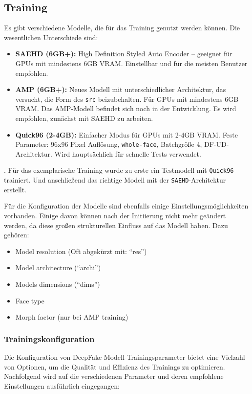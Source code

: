 \subsection*{Training}\label{subsec:training}
Es gibt verschiedene Modelle, die für das Training genutzt werden können.
Die wesentlichen Unterschiede sind:
\begin{itemize}
    \item \textbf{SAEHD (6GB+):} High Definition Styled Auto Encoder – geeignet für GPUs mit mindestens 6GB VRAM.
    Einstellbar und für die meisten Benutzer empfohlen.
    \item \textbf{AMP (6GB+):} Neues Modell mit unterschiedlicher Architektur, das versucht, die Form des \texttt{src} beizubehalten.
    Für GPUs mit mindestens 6GB VRAM.
Das AMP-Modell befindet sich noch in der Entwicklung.
    Es wird empfohlen, zunächst mit SAEHD zu arbeiten.
    \item \textbf{Quick96 (2-4GB):} Einfacher Modus für GPUs mit 2-4GB VRAM.
    Feste Parameter: 96x96 Pixel Auflösung, \texttt{whole-face}, Batchgröße 4, DF-UD-Architektur.
    Wird hauptsächlich für schnelle Tests verwendet.
\end{itemize}.
Für das exemplarische Training wurde zu erste ein Testmodell mit \texttt{Quick96} trainiert.
Und anschließend das richtige Modell mit der \texttt{SAEHD}-Architektur erstellt.

Für die Konfiguration der Modelle sind ebenfalls einige Einstellungsmöglichkeiten vorhanden.
Einige davon können nach der Initiierung nicht mehr geändert werden, da diese großen strukturellen Einfluss auf das Modell haben.
Dazu gehören:
\begin{itemize}
    \item Model resolution (Oft abgekürzt mit: ``res'')
    \item Model architecture (``archi'')
    \item Models dimensions (``dims'')
    \item Face type
    \item Morph factor (nur bei AMP training)
\end{itemize}

\subsubsection{Trainingskonfiguration}
Die Konfiguration von DeepFake-Modell-Trainingsparameter bietet eine Vielzahl von Optionen, um die Qualität und Effizienz des Trainings zu optimieren.
Nachfolgend wird auf die verschiedenen Parameter und deren empfohlene Einstellungen ausführlich eingegangen:

